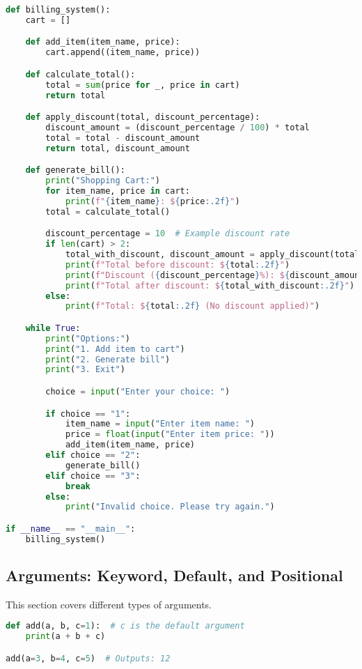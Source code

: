 \documentclass{article}
\begin{document}
\begin{lstlisting}[language=Python, caption={Billing System with Nested Functions}]
def billing_system():
    cart = []

    def add_item(item_name, price):
        cart.append((item_name, price))

    def calculate_total():
        total = sum(price for _, price in cart)
        return total

    def apply_discount(total, discount_percentage):
        discount_amount = (discount_percentage / 100) * total
        total = total - discount_amount
        return total, discount_amount

    def generate_bill():
        print("Shopping Cart:")
        for item_name, price in cart:
            print(f"{item_name}: ${price:.2f}")
        total = calculate_total()

        discount_percentage = 10  # Example discount rate
        if len(cart) > 2:
            total_with_discount, discount_amount = apply_discount(total, discount_percentage)
            print(f"Total before discount: ${total:.2f}")
            print(f"Discount ({discount_percentage}%): ${discount_amount:.2f}")
            print(f"Total after discount: ${total_with_discount:.2f}")
        else:
            print(f"Total: ${total:.2f} (No discount applied)")

    while True:
        print("Options:")
        print("1. Add item to cart")
        print("2. Generate bill")
        print("3. Exit")

        choice = input("Enter your choice: ")

        if choice == "1":
            item_name = input("Enter item name: ")
            price = float(input("Enter item price: "))
            add_item(item_name, price)
        elif choice == "2":
            generate_bill()
        elif choice == "3":
            break
        else:
            print("Invalid choice. Please try again.")

if __name__ == "__main__":
    billing_system()
\end{lstlisting}

\newpage
\subsection{Arguments: Keyword, Default, and Positional}
This section covers different types of arguments.

\begin{lstlisting}[language=Python, caption={Keyword and Default Arguments}]
def add(a, b, c=1):  # c is the default argument
    print(a + b + c)

add(a=3, b=4, c=5)  # Outputs: 12
\end{lstlisting}
\end{document}
